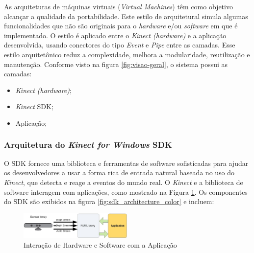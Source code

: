 As arquiteturas de máquinas virtuais (\textit{Virtual Machines}) têm como objetivo alcançar a qualidade da portabilidade. Este estilo de arquitetural simula algumas funcionalidades que não são originais para o \textit{hardware} e/ou \textit{software} em que é implementado. O estilo é aplicado entre o \textit{Kinect (hardware)} e a aplicação desenvolvida, usando conectores do tipo \textit{Event} e \textit{Pipe} entre as camadas. Esse estilo arquitetônico reduz a complexidade, melhora a modularidade, reutilização e manutenção.
Conforme visto na figura \ref{fig:visao-geral}, o sistema possui as camadas:

\begin{itemize}
\item \textit{Kinect (hardware)};
\item \textit{Kinect} SDK; 
\item Aplicação; 
\end{itemize}

\subsubsection{Arquitetura do \textit{Kinect for Windows} SDK}\label{sec:kinectSDK}
O SDK fornece uma biblioteca e ferramentas de software sofisticadas para ajudar os desenvolvedores a usar a forma rica de entrada natural baseada no uso do \textit{Kinect}, que detecta e reage a eventos do mundo real. O \textit{Kinect} e a biblioteca de software interagem com aplicações, como mostrado na Figura \ref{fig:sdk_interact}. Os componentes do SDK são exibidos na figura \ref{fig:sdk_architecture_color} e incluem:

\begin{figure}[ht]
\centering
\includegraphics[width=0.5\textwidth]{images/sdk_interaction.png}
\caption{Interação de Hardware e Software com a Aplicação}
\label{fig:sdk_interact}
\end{figure}




